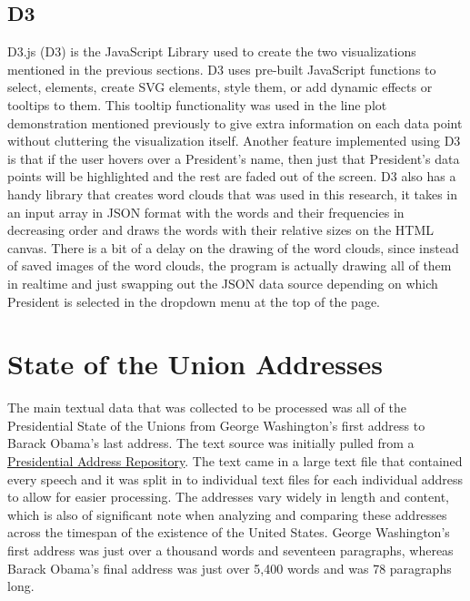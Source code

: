\subsection{D3}
D3.js (D3) is the JavaScript Library used to create the two visualizations mentioned in the previous sections.
D3 uses pre-built JavaScript functions to select, elements, create SVG elements, style them, or add dynamic effects or tooltips to them.
This tooltip functionality was used in the line plot demonstration mentioned previously to give extra information on each data point without cluttering the visualization itself.
Another feature implemented using D3 is that if the user hovers over a President's name, then just that President's data points will be highlighted and the rest are faded out of the screen.
D3 also has a handy library that creates word clouds that was used in this research, it takes in an input array in JSON format with the words and their frequencies in decreasing order and draws the words with their relative sizes on the HTML canvas.
There is a bit of a delay on the drawing of the word clouds, since instead of saved images of the word clouds, the program is actually drawing all of them in realtime and just swapping out the JSON data source depending on which President is selected in the dropdown menu at the top of the page.

\section{State of the Union Addresses}
The main textual data that was collected to be processed was all of the Presidential State of the Unions from George Washington's first address to Barack Obama's last address.
The text source was initially pulled from a \href{http://stateoftheunion.onetwothree.net/appendices.html#source}{Presidential Address Repository}.
The text came in a large text file that contained every speech and it was split in to individual text files for each individual address to allow for easier processing.
The addresses vary widely in length and content, which is also of significant note when analyzing and comparing these addresses across the timespan of the existence of the United States.
George Washington's first address was just over a thousand words and seventeen paragraphs, whereas Barack Obama's final address was just over 5,400 words and was 78 paragraphs long.

